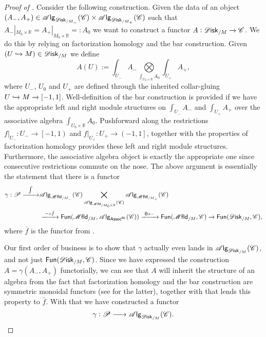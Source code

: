\documentclass[../text]{subfiles}
\begin{document}
\begin{proof}[Proof of ]
    Consider the following construction. Given the data of an object $(A_-, A_+) \in \alg{\disk_{/M_-}} (\catC) \times \alg{\disk_{/M_+}} (\catC)$ such that $A_-|_{M_0 \times \mathbb{R}} = A_+|_{M_0 \times \mathbb{R}} = : A_0$ we want to construct a functor $A: \disk_{/M} \xrightarrow{} \catC$. We do this by relying on factorization homology and the bar construction. Given $(U \xhookrightarrow{} M) \in \disk_{/M}$ we define
    \begin{equation}\label{eq:def_of_A_in_proof}
        A(U) := \int_{U_-} A_- \bigotimes\limits_{\int_{U_0 \times \mathbb{R}} A_0} \int_{U_+} A_+,
    \end{equation}
    where $U_-$, $U_0$ and $U_+$ are defined through the inherited collar-gluing $U \xhookrightarrow{} M \xrightarrow{} [-1,1]$. Well-definition of the bar construction is provided if we have the appropriate left and right module structures on $\int_{U_-} A_-$ and $\int_{U_+} A_+$ over the associative algebra $\int_{U_0 \times \mathbb{R}} A_0$. Pushforward along the restrictions $f|_{U_-}: U_- \rightarrow \left[-1, 1\right)$ and $f|_{U_+}: U_+ \rightarrow \left(-1, 1\right]$, together with the properties of factorization homology provides these left and right module structures. Furthermore, the associative algebra object is exactly the appropriate one since consecutive restrictions commute on the nose. The above argument is essentially the statement that there is a functor
    \begin{align}
        \gamma: \mathscr{P} \xrightarrow{\ \ \int \ \ } &\alg{\mfld_{/M_-}}(\catC) \bigtimes\limits_{\alg{\mfld_{/M_0 \times \mathbb{R}}} (\catC)} \alg{\mfld_{/M_+}} (\catC)\notag\\ &\xrightarrow{\ - \circ \bar{f} \ } \mathsf{Fun}(\mfld_{/M}, \alg{\mathsf{Assoc^{RL}}} (\catC)) \xrightarrow{\ \mathsf{B} \circ - \ } \mathsf{Fun}(\mfld_{/M},\catC) \xrightarrow{\ } \mathsf{Fun}(\disk_{/M}, \catC),
    \end{align}
    where $\bar{f}$ is the functor from .

    Our first order of business is to show that $\gamma$ actually even lands in $\alg{\disk_{/M}} (\catC)$, and not just $\mathsf{Fun}(\disk_{/M}, \catC)$. Since we have expressed the construction $A = \gamma(A_-, A_+)$ functorially, we can see that $A$ will inherit the structure of an algebra from the fact that factorization homology and the bar construction are symmetric monoidal functors (see  for the latter), together with  that lends this property to $\bar{f}$. With that we have constructed a functor
    \begin{equation}
        \gamma : \mathscr{P} \xrightarrow{\ \ \ \ } \alg{\disk_{/M}} (\catC).
    \end{equation}
    

\end{proof}
\end{document}
